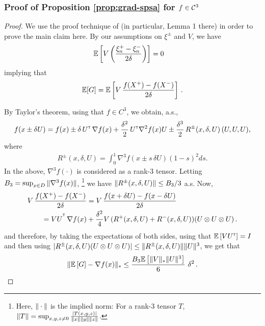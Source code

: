 \subsubsection*{Proof of Proposition \ref{prop:grad-spsa} for $f \in \mathcal{C}^3$}
\begin{proof}
We use the proof technique of \cite{spall1992multivariate} (in particular, Lemma 1 there) in order to prove the main claim here.
By our assumptions on $\xi^{\pm}$ and $V$,  we have
\begin{align*}
&\mathbb{E}\left[  V\left(\dfrac{\xi_n^+ - \xi_n^-}{2\delta}\right) \right]= 0 
\end{align*}
implying that
\begin{align*}
\mathbb{E}[G] =  \mathbb{E}\left[V\,  \dfrac{f(X^+)  -f(X^-)}{2\delta} \right]\,.
\end{align*}

By Taylor's theorem, using that $f\in C^3$, we obtain, a.s., 
\begin{align*}
f(x \pm \delta U) =
 f(x) 
 \pm\delta\,  U^\mathsf{\scriptscriptstyle T}\,\nabla f(x)   
  + \frac{\delta^2}{2}\, U^\mathsf{\scriptscriptstyle T} \nabla^2 f(x) U 
  \pm  \frac{\delta^3}{2} \, R^{\pm}(x,\delta,U) \,(U, U, U),
\end{align*}
where
\begin{align}
 R^{\pm}(x,\delta,U)= \int_0^1  \nabla^3 f(  x \pm s \, \delta U ) (1-s)^2 ds. \label{eq:taylor-r}
\end{align}
In the above, $\nabla^3 f(\cdot)$ is considered as a rank-3 tensor.
Letting $B_3 = \sup_{x\in D} \| \nabla^3 f(x) \|$,%
\footnote{Here, $\|\cdot\|$ is the implied norm: For a rank-3 tensor $T$, $\|T\| = \sup_{x,y,z\ne 0}
\frac{|T (x,y,z)|}{\|x\|\|y\|\|z\|}$.
}
we have $\| R^{\pm}(x,\delta,U)\| \le B_3/3$ a.s.
Now,
\begin{align}
\begin{split}
\MoveEqLeft       V\, \dfrac{f(X^+)-f(X^-)}{2\delta}
  = V\, \dfrac{f(x+\delta U) - f(x-\delta U)}{2\delta} \\
&= VU^{\tr}
\, \nabla f(x)   +   \frac{\delta^2}{4}  V \,(R^{+}(x,\delta,U)+R^{-}(x,\delta,U))(U \otimes U \otimes U)\,. 
\end{split}
\label{eq:l1}
\end{align}
and therefore, 
by taking the expectations of both sides, 
using that $\mathbb{E}\left[V U^\mathsf{\scriptscriptstyle T}\right] = I$ and then using $|R^{\pm}(x,\delta,U) (U \otimes U \otimes U)| \le 
\|R^{\pm}(x,\delta,U)\| \|U\|^3$, 
we get that
\begin{align*}
\| \mathbb{E}\left[ G \right] - \nabla f(x) \|_* 
\le \frac{B_3 \mathbb{E}\left[ \|V\|_* \|U\|^3 \right]}{6}\,\, \delta^2 \,.
\end{align*}


\end{proof}
